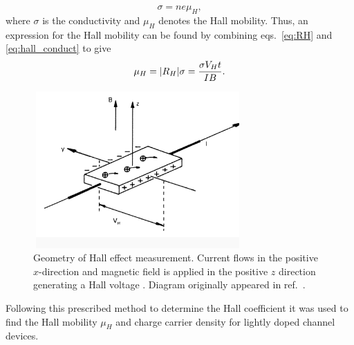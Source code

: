 \begin{equation}\label{eq:hall_conduct}
	\sigma = n e \mu_H,
\end{equation}
where $\sigma$ is the conductivity and $\mu_H$ denotes the Hall mobility. Thus, an expression for the Hall mobility can be found by combining eqs.~\ref{eq:RH} and \ref{eq:hall_conduct} to give
\begin{equation}\label{eq:mu_H}
	\mu_H = \abs{R_H}\sigma = \frac{\sigma V_H t}{I B}.
\end{equation}
\begin{figure}[ht]
	\centering
	\includegraphics[height=6cm,width=8cm]{figs/results/hall_diagram}
	\caption[Hall effect measurement diagram]{Geometry of Hall effect measurement. Current flows in the positive $x$-direction and magnetic field is applied in the positive $z$ direction generating a Hall voltage \cite{HallEffectNIST}. Diagram originally appeared in ref.~\cite{HallDiagram}.}
	\label{fig:hall_diagram}
\end{figure}
\noindent Following this prescribed method to determine the Hall coefficient it was used to find the Hall mobility $\mu_H$ and charge carrier density for lightly doped channel  devices.
